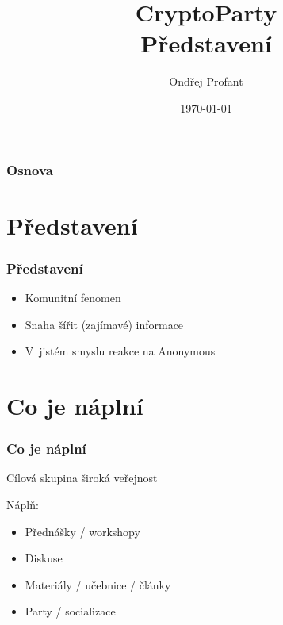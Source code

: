 \documentclass[xetex]{beamer}
\title{CryptoParty\\Představení}
\author{Ondřej Profant}
\institute[Piráti]{CryptoParty\\Česká pirátská strana}
\date{\today}
\begin{document}
\begin{frame}
  \titlepage
\end{frame}

\begin{frame}
  \frametitle{Osnova}
  \tableofcontents
\end{frame}	

\section{Představení}
\begin{frame}
 \frametitle{Představení}
	\begin{itemize}
		\item<2-4> Komunitní fenomen
		\item<3-4> Snaha šířit (zajímavé) informace
		\item<4-4> V~jistém smyslu reakce na Anonymous
	\end{itemize}
\end{frame}


\section{Co je náplní}
\begin{frame}
 \frametitle{Co je náplní}
 
 \begin{block}{Cílová skupina}
 široká veřejnost
 \end{block}
 
 \bigskip
 
 Náplň:
 \begin{itemize} 
		\item<2-5> Přednášky / workshopy
		\item<3-5> Diskuse
		\item<4-5> Materiály / učebnice / články
		\item<5-5> Party / socializace
 \end{itemize}
\end{frame}
\end{document}
